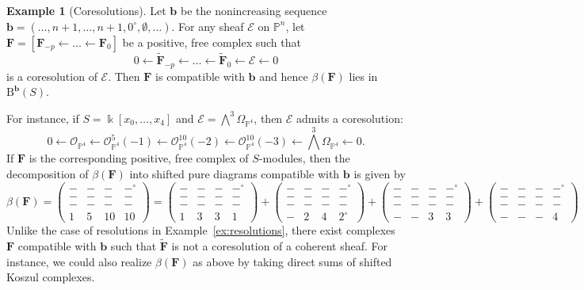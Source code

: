 \documentclass[12pt]{amsart}
\theoremstyle{definition}
\newtheorem{example}[lemma]{Example}
\theoremstyle{remark}
\newcommand{\kk}{\Bbbk}
\newcommand{\PP}{\mathbb{P}}
\newcommand{\bb}{\mathbf{b}}
\newcommand{\cO}{\mathcal{O}}
\newcommand{\cE}{\mathcal{E}}
\newcommand{\FF}{\mathbf{F}}
\newcommand{\zp}{\circ}
\newcommand{\BBQ}{\mathrm{B}}
\begin{document}
\begin{example}[Coresolutions]\label{ex:coresolutions}
Let $\bb$ be the nonincreasing sequence $\bb=(\dots, n+1, \dots, n+1, 0^\zp,\emptyset, \dots)$.  For any sheaf $\cE$ on $\PP^n$, let $\FF=[\FF_{-p}\gets \dots \gets \FF_0]$ be a positive, free complex such that 
\[
0\gets \widetilde{\FF}_{-p}\gets \dots \gets \widetilde{\FF}_0\gets \cE\gets 0
\]
is a coresolution of $\cE$.  Then $\FF$ is compatible with $\bb$ and hence $\beta(\FF)$ lies in $\BBQ^{\bb}(S)$.  

For instance, if $S=\kk[x_0, \dots, x_4]$ and $\cE=\bigwedge^3 \Omega_{\PP^4}$, then $\cE$ admits a coresolution:
\[
0\gets \cO_{\PP^4}\gets  \cO_{\PP^4}^5(-1)\gets  \cO_{\PP^4}^{10}(-2)\gets  \cO_{\PP^4}^{10}(-3)\gets \bigwedge^3 \Omega_{\PP^4}\gets 0.
\]
If $\FF$ is the corresponding positive, free complex of $S$-modules, then the decomposition of $\beta(\FF)$ into shifted pure diagrams compatible with $\bb$ is given by
\[
\beta(\FF)=\left(\begin{smallmatrix}-&-&-&-^\zp\\
-&-&-&-\\
-&-&-&-\\
1&5&10&10
\end{smallmatrix}\right)
=\left(\begin{smallmatrix}
-&-&-&-^\zp\\
-&-&-&-\\
-&-&-&-\\1&3&3&1
\end{smallmatrix}\right)
+
\left(\begin{smallmatrix}
-&-&-&-^\zp\\
-&-&-&-\\
-&-&-&-\\-&2&4&2^\zp
\end{smallmatrix}\right)
+
\left(\begin{smallmatrix}
-&-&-&-^\zp\\
-&-&-&-\\
-&-&-&-\\
-&-&3&3
\end{smallmatrix}\right)
+
\left(\begin{smallmatrix}
-&-&-&-^\zp\\
-&-&-&-\\
-&-&-&-\\
-&-&-&4
\end{smallmatrix}\right)
\]
Unlike the case of resolutions in Example~\ref{ex:resolutions}, there exist complexes $\FF$ compatible with $\bb$ such that $\widetilde{\FF}$ is not a coresolution of a coherent sheaf.  For instance, we could also realize $\beta(\FF)$ as above by taking direct sums of shifted Koszul complexes.
\end{example}
\end{document}
